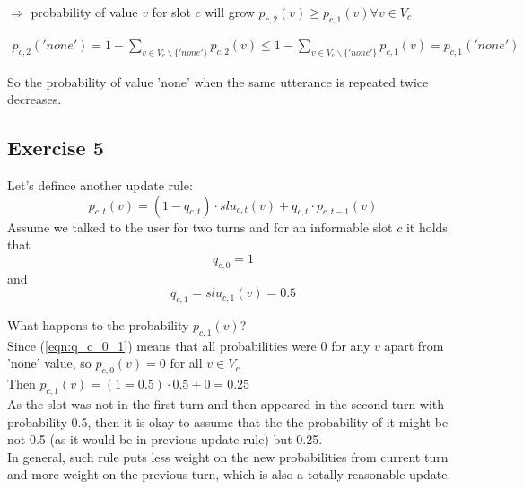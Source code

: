 \documentclass[12pt,titlepage,a4paper]{article}
\begin{document}
$\Rightarrow$ probability of value $v$  for slot $c$ will grow $p_{c,2}(v) \geq p_{c,1}(v) \forall v \in V_c $

\begin{equation}
    \begin{aligned}
        p_{c,2}('none') = 1 - \sum_{v \in V_{c} \backslash \{'none'\}} p_{c,2}(v) \leq 1 - \sum_{v \in V_{c} \backslash \{'none'\}} p_{c,1}(v)  = p_{c,1}('none')
    \end{aligned}
\end{equation}

So the probability of value 'none' when the same utterance is repeated twice decreases.

\subsection{Exercise 5}
Let's defince another update rule:
\begin{equation}
    p_{c,t}(v) = (1-q_{c,t})\cdot slu_{c,t}(v) + q_{c,t} \cdot p_{c,t-1}(v)
\end{equation}
Assume we talked to the user for two turns and for an informable slot $c$ it holds that 
\begin{equation}
    \label{eqn:q_c_0_1}
    q_{c, 0} = 1
\end{equation}
and 
\begin{equation}
    \label{eqn:q_c_1}
    q_{c, 1} = slu_{c,1}(v) = 0.5
\end{equation}

\noindent What happens to the probability $p_{c,1}(v)$?\\

\noindent Since (\ref{eqn:q_c_0_1}) means that all probabilities were 0 for any $v$ apart from 'none' value, so $p_{c,0}(v) = 0$ for all $v \in V_c$ \\

\noindent Then $p_{c,1}(v) = (1 = 0.5) \cdot 0.5 + 0 = 0.25$ \\

\noindent As the slot was not in the first turn and then appeared in the second turn with probability 0.5, then it is okay to assume that the the probability of it might be not 0.5 (as it would be in previous update rule) but 0.25. \\

\noindent In general, such rule puts less weight on the new probabilities from current turn and more weight on the previous turn, which is also a totally reasonable update. 
\end{document}

